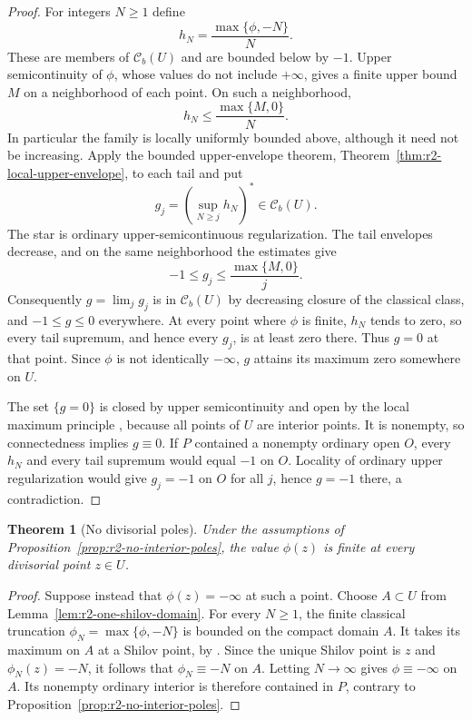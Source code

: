 \documentclass[11pt,a4paper]{article}
\numberwithin{equation}{section}
\newtheorem{theorem}{Theorem}[section]
\theoremstyle{definition}
\theoremstyle{remark}
\newcommand{\Cb}{\mathcal C_b}
\begin{document}
\begin{proof}
For integers $N\geq1$ define
\[
 h_N=\frac{\max\{\phi,-N\}}{N}.
\]
These are members of $\Cb(U)$ and are bounded below by $-1$.
Upper semicontinuity of $\phi$, whose values do not include $+\infty$,
gives a finite upper bound $M$ on a neighborhood of each point. On
such a neighborhood,
\[
 h_N\leq \frac{\max\{M,0\}}{N}.
\]
In particular the family is locally uniformly bounded above, although
it need not be increasing. Apply the bounded upper-envelope theorem,
Theorem~\ref{thm:r2-local-upper-envelope}, to each tail and put
\[
 g_j=\left(\sup_{N\geq j}h_N\right)^*\in\Cb(U).
\]
The star is ordinary upper-semicontinuous regularization. The tail
envelopes decrease, and on the same neighborhood the estimates give
\[
 -1\leq g_j\leq\frac{\max\{M,0\}}j.
\]
Consequently $g=\lim_j g_j$ is in $\Cb(U)$ by decreasing closure
of the classical class, and $-1\leq g\leq0$ everywhere. At every
point where $\phi$ is finite, $h_N$ tends to zero, so every tail
supremum, and hence every $g_j$, is at least zero there. Thus $g=0$
at that point. Since $\phi$ is not identically $-\infty$, $g$
attains its maximum zero somewhere on $U$.

The set $\{g=0\}$ is closed by upper semicontinuity and open by
the local maximum principle \cite[Theorem~6.1, pp.~30--31]{GR25},
because all points of $U$ are interior points. It is nonempty, so
connectedness implies $g\equiv0$. If $P$ contained a nonempty
ordinary open $O$, every $h_N$ and every tail supremum would equal
$-1$ on $O$. Locality of ordinary upper regularization would give
$g_j=-1$ on $O$ for all $j$, hence $g=-1$ there, a contradiction.
\end{proof}

\begin{theorem}[No divisorial poles]
\label{thm:r2-no-divisorial-poles}
Under the assumptions of Proposition~\ref{prop:r2-no-interior-poles},
the value $\phi(z)$ is finite at every divisorial point $z\in U$.
\end{theorem}

\begin{proof}
Suppose instead that $\phi(z)=-\infty$ at such a point. Choose
$A\subset U$ from Lemma~\ref{lem:r2-one-shilov-domain}. For every
$N\geq1$, the finite classical truncation
$\phi_N=\max\{\phi,-N\}$ is bounded on the compact domain $A$.
It takes its maximum on $A$ at a Shilov
point, by \cite[Theorem~6.4, pp.~33--34]{GR25}. Since the unique
Shilov point is $z$ and $\phi_N(z)=-N$, it follows that
$\phi_N\equiv-N$ on $A$. Letting $N\to\infty$ gives
$\phi\equiv-\infty$ on $A$. Its nonempty ordinary interior is
therefore contained in $P$, contrary to
Proposition~\ref{prop:r2-no-interior-poles}.
\end{proof}
\end{document}
